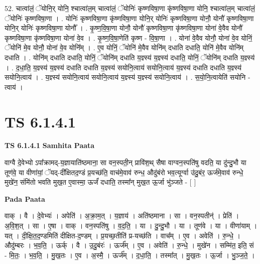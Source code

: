\documentclass[17pt]{extarticle}
\begin{document}
52. चात्वा॑लं॒ ॅयोनि॒र् योनि॒ श्चात्वा॑ल॒म् चात्वा॑लं॒ ॅयोनिः॑ कृष्णविषा॒णा कृ॑ष्णविषा॒णा योनि॒ श्चात्वा॑ल॒म् चात्वा॑लं॒ ॅयोनिः॑ कृष्णविषा॒णा । . योनिः॑ कृष्णविषा॒णा कृ॑ष्णविषा॒णा योनि॒र् योनिः॑ कृष्णविषा॒णा योनौ॒ योनौ॑ कृष्णविषा॒णा योनि॒र् योनिः॑ कृष्णविषा॒णा योनौ᳚ । . कृ॒ष्ण॒वि॒षा॒णा योनौ॒ योनौ॑ कृष्णविषा॒णा कृ॑ष्णविषा॒णा योना॑ वे॒वैव योनौ॑ कृष्णविषा॒णा कृ॑ष्णविषा॒णा योना॑ वे॒व । . कृ॒ष्ण॒वि॒षा॒णेति॑ कृष्ण - वि॒षा॒णा । . योना॑ वे॒वैव योनौ॒ योना॑ वे॒व योनिं॒ ॅयोनि॑ मे॒व योनौ॒ योना॑ वे॒व योनि᳚म् । . ए॒व योनिं॒ ॅयोनि॑ मे॒वैव योनि॑म् दधाति दधाति॒ योनि॑ मे॒वैव योनि॑म् दधाति । . योनि॑म् दधाति दधाति॒ योनिं॒ ॅयोनि॑म् दधाति य॒ज्ञ्स्य॑ य॒ज्ञ्स्य॑ दधाति॒ योनिं॒ ॅयोनि॑म् दधाति य॒ज्ञ्स्य॑ । . द॒धा॒ति॒ य॒ज्ञ्स्य॑ य॒ज्ञ्स्य॑ दधाति दधाति य॒ज्ञ्स्य॑ सयोनि॒त्वाय॑ सयोनि॒त्वाय॑ य॒ज्ञ्स्य॑ दधाति दधाति य॒ज्ञ्स्य॑ सयोनि॒त्वाय॑ । . य॒ज्ञ्स्य॑ सयोनि॒त्वाय॑ सयोनि॒त्वाय॑ य॒ज्ञ्स्य॑ य॒ज्ञ्स्य॑ सयोनि॒त्वाय॑ । . स॒यो॒नि॒त्वायेति॑ सयोनि - त्वाय॑ । \newline
\pagebreak
{}

\section{ TS 6.1.4.1 }

\textbf{TS 6.1.4.1 } \newline
\textbf{Samhita Paata} \newline

वाग्वै दे॒वेभ्यो ऽपा᳚क्रामद्-य॒ज्ञायाति॑ष्ठमाना॒ सा वन॒स्पती॒न् प्रावि॑श॒थ् सैषा वाग्वन॒स्पति॑षु वदति॒ या दु॑न्दु॒भौ या तूण॑वे॒ या वीणा॑यां॒ ॅयद्-दी᳚क्षितद॒ण्डं प्र॒यच्छ॑ति॒ वाच॑मे॒वाव॑ रुन्ध॒ औदु॑बंरो भव॒त्यूर्ग्वा उ॑दु॒बंर॒ ऊर्ज॑मे॒वाव॑ रुन्धे॒ मुखे॑न॒ संमि॑तो भवति मुख॒त ए॒वास्मा॒ ऊर्जं॑ दधाति॒ तस्मा᳚न् मुख॒त ऊ॒र्जा भु॑ञ्जते - [  ] \newline

\textbf{Pada Paata} \newline

वाक् । वै । दे॒वेभ्यः॑ । अपेति॑ । अ॒क्रा॒म॒त् । य॒ज्ञाय॑ । अति॑ष्ठमाना । सा । वन॒स्पतीन्॑ । प्रेति॑ । अ॒वि॒श॒त् । सा । ए॒षा । वाक् । वन॒स्पति॑षु । व॒द॒ति॒ । या । दु॒न्दु॒भौ । या । तूण॑वे । या । वीणा॑याम् । यत् । दी॒क्षि॒त॒द॒ण्डमिति॑ दीक्षित-द॒ण्डम् । प्र॒यच्छ॒तीति॑ प्र-यच्छ॑ति । वाच᳚म् । ए॒व । अवेति॑ । रु॒न्धे॒ । औदु॑म्बरः । भ॒व॒ति॒ । ऊर्क् । वै । उ॒दु॒बंरः॑ । ऊर्ज᳚म् । ए॒व । अवेति॑ । रु॒न्धे॒ । मुखे॑न । सम्मि॑त॒ इति॒ सं - मि॒तः॒ । भ॒व॒ति॒ । मु॒ख॒तः । ए॒व । अ॒स्मै॒ । ऊर्ज᳚म् । द॒धा॒ति॒ । तस्मा᳚त् । मु॒ख॒तः । ऊ॒र्जा । भु॒ञ्ज॒ते॒ ।  \newline
\end{document}

